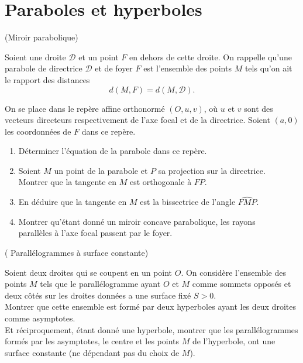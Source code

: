 \documentclass[a4paper,12pt,reqno]{amsart}
\begin{document}
\section{Paraboles et hyperboles}

\begin{exo} (Miroir parabolique)


  Soient une droite $\mathcal{D}$ et un point $F$ en dehors de cette droite. On rappelle qu'une parabole de directrice $\mathcal{D}$ et de foyer $F$ est l'ensemble des points $M$ tels qu'on ait le rapport des distances
  $$
    d(M,F)= d(M,\mathcal{D}).
  $$


  On se place dans le repère affine orthonormé $(O,u,v)$, où $u$ et $v$ sont des vecteurs directeurs respectivement de l'axe focal et de la directrice. Soient $(a,0)$ les coordonnées de $F$ dans ce repère.

  \begin{enumerate}

    \item Déterminer l'équation de la parabole dans ce repère.

    \item Soient $M$ un point de la parabole et $P$ sa projection sur la directrice.\\
    Montrer que la tangente en $M$ est orthogonale à $FP$.

    \item En déduire que la tangente en $M$ est la bissectrice de l'angle $\widehat{FMP}$.

    \item Montrer qu'étant donné un miroir concave parabolique, les rayons\\
    parallèles à l'axe focal passent par le foyer.
  \end{enumerate}

\end{exo}

\begin{exo} ( Parallélogrammes à surface constante)


  Soient deux droites qui se coupent en un point $O$. On considère l'ensemble des points $M$ tels que le parallélogramme ayant $O$ et $M$ comme sommets opposés et deux côtés sur les droites données a une surface fixé $S>0$.\\
  Montrer que cette ensemble est formé par deux hyperboles ayant les deux droites comme asymptotes. \\
  Et réciproquement, étant donné une hyperbole, montrer que les parallélogrammes formés par les asymptotes, le centre et les points $M$ de l'hyperbole, ont une surface constante (ne dépendant pas du choix de $M$).
\end{exo}
\end{document}
